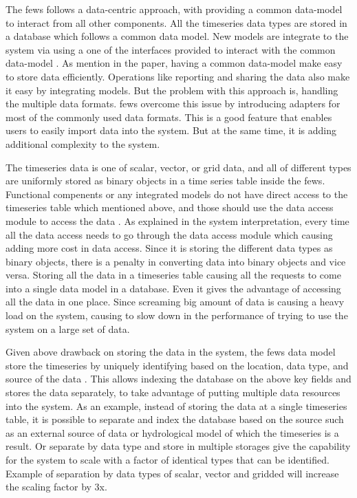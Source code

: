The \acrshort{fews} follows a data-centric approach, with providing a common data-model to interact from all other components. All the timeseries data types are stored in a database which follows a common data model. New models are integrate to the system via using a one of the interfaces provided to interact with the common data-model \cite{Werner2013TheSystem}. As mention in the paper, having a common data-model make easy to store data efficiently. Operations like reporting and sharing the data also make it easy by integrating models. But the problem with this approach is, handling the multiple data formats. \acrshort{fews} overcome this issue by introducing adapters for most of the commonly used data formats. This is a good feature that enables users to easily import data into the system. But at the same time, it is adding additional complexity to the system.

The timeseries data is one of scalar, vector, or grid data, and all of different types are uniformly stored as binary objects in a time series table inside the \acrshort{fews}. Functional compenents or any integrated models do not have direct access to the timeseries table which mentioned above, and those should use the data access module to access the data \cite{Werner2013TheSystem}. As explained in the system interpretation, every time all the data access needs to go through the data access module which causing adding more cost in data access. Since it is storing the different data types as binary objects, there is a penalty in converting data into binary objects and vice versa. Storing all the data in a timeseries table causing all the requests to come into a single data model in a database. Even it gives the advantage of accessing all the data in one place. Since screaming big amount of data is causing a heavy load on the system, causing to slow down in the performance of trying to use the system on a large set of data.

Given above drawback on storing the data in the system, the \acrshort{fews} data model store the timeseries by uniquely identifying based on the location, data type, and source of the data \cite{Werner2013TheSystem}. This allows indexing the database on the above key fields and stores the data separately, to take advantage of putting multiple data resources into the system. As an example, instead of storing the data at a single timeseries table, it is possible to separate and index the database based on the source such as an external source of data or hydrological model of which the timeseries is a result. Or separate by data type and store in multiple storages give the capability for the system to scale with a factor of identical types that can be identified. Example of separation by data types of scalar, vector and gridded will increase the scaling factor by 3x.

